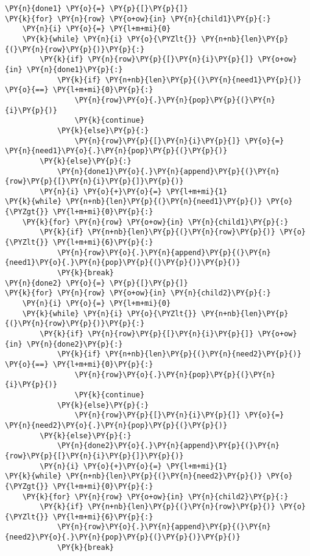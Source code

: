 \begin{tcolorbox}[breakable, size=fbox, boxrule=1pt, pad at break*=1mm,colback=cellbackground, colframe=cellborder]
\begin{Verbatim}[commandchars=\\\{\}]
\PY{n}{done1} \PY{o}{=} \PY{p}{[}\PY{p}{]}
\PY{k}{for} \PY{n}{row} \PY{o+ow}{in} \PY{n}{child1}\PY{p}{:}
    \PY{n}{i} \PY{o}{=} \PY{l+m+mi}{0}
    \PY{k}{while} \PY{n}{i} \PY{o}{\PYZlt{}} \PY{n+nb}{len}\PY{p}{(}\PY{n}{row}\PY{p}{)}\PY{p}{:}
        \PY{k}{if} \PY{n}{row}\PY{p}{[}\PY{n}{i}\PY{p}{]} \PY{o+ow}{in} \PY{n}{done1}\PY{p}{:}
            \PY{k}{if} \PY{n+nb}{len}\PY{p}{(}\PY{n}{need1}\PY{p}{)} \PY{o}{==} \PY{l+m+mi}{0}\PY{p}{:}
                \PY{n}{row}\PY{o}{.}\PY{n}{pop}\PY{p}{(}\PY{n}{i}\PY{p}{)}
                \PY{k}{continue}
            \PY{k}{else}\PY{p}{:}
                \PY{n}{row}\PY{p}{[}\PY{n}{i}\PY{p}{]} \PY{o}{=} \PY{n}{need1}\PY{o}{.}\PY{n}{pop}\PY{p}{(}\PY{p}{)}
        \PY{k}{else}\PY{p}{:}
            \PY{n}{done1}\PY{o}{.}\PY{n}{append}\PY{p}{(}\PY{n}{row}\PY{p}{[}\PY{n}{i}\PY{p}{]}\PY{p}{)}
        \PY{n}{i} \PY{o}{+}\PY{o}{=} \PY{l+m+mi}{1}
\PY{k}{while} \PY{n+nb}{len}\PY{p}{(}\PY{n}{need1}\PY{p}{)} \PY{o}{\PYZgt{}} \PY{l+m+mi}{0}\PY{p}{:}
    \PY{k}{for} \PY{n}{row} \PY{o+ow}{in} \PY{n}{child1}\PY{p}{:}
        \PY{k}{if} \PY{n+nb}{len}\PY{p}{(}\PY{n}{row}\PY{p}{)} \PY{o}{\PYZlt{}} \PY{l+m+mi}{6}\PY{p}{:}
            \PY{n}{row}\PY{o}{.}\PY{n}{append}\PY{p}{(}\PY{n}{need1}\PY{o}{.}\PY{n}{pop}\PY{p}{(}\PY{p}{)}\PY{p}{)}
            \PY{k}{break}
\PY{n}{done2} \PY{o}{=} \PY{p}{[}\PY{p}{]}
\PY{k}{for} \PY{n}{row} \PY{o+ow}{in} \PY{n}{child2}\PY{p}{:}
    \PY{n}{i} \PY{o}{=} \PY{l+m+mi}{0}
    \PY{k}{while} \PY{n}{i} \PY{o}{\PYZlt{}} \PY{n+nb}{len}\PY{p}{(}\PY{n}{row}\PY{p}{)}\PY{p}{:}
        \PY{k}{if} \PY{n}{row}\PY{p}{[}\PY{n}{i}\PY{p}{]} \PY{o+ow}{in} \PY{n}{done2}\PY{p}{:}
            \PY{k}{if} \PY{n+nb}{len}\PY{p}{(}\PY{n}{need2}\PY{p}{)} \PY{o}{==} \PY{l+m+mi}{0}\PY{p}{:}
                \PY{n}{row}\PY{o}{.}\PY{n}{pop}\PY{p}{(}\PY{n}{i}\PY{p}{)}
                \PY{k}{continue}
            \PY{k}{else}\PY{p}{:}
                \PY{n}{row}\PY{p}{[}\PY{n}{i}\PY{p}{]} \PY{o}{=} \PY{n}{need2}\PY{o}{.}\PY{n}{pop}\PY{p}{(}\PY{p}{)}
        \PY{k}{else}\PY{p}{:}
            \PY{n}{done2}\PY{o}{.}\PY{n}{append}\PY{p}{(}\PY{n}{row}\PY{p}{[}\PY{n}{i}\PY{p}{]}\PY{p}{)}
        \PY{n}{i} \PY{o}{+}\PY{o}{=} \PY{l+m+mi}{1}
\PY{k}{while} \PY{n+nb}{len}\PY{p}{(}\PY{n}{need2}\PY{p}{)} \PY{o}{\PYZgt{}} \PY{l+m+mi}{0}\PY{p}{:}
    \PY{k}{for} \PY{n}{row} \PY{o+ow}{in} \PY{n}{child2}\PY{p}{:}
        \PY{k}{if} \PY{n+nb}{len}\PY{p}{(}\PY{n}{row}\PY{p}{)} \PY{o}{\PYZlt{}} \PY{l+m+mi}{6}\PY{p}{:}
            \PY{n}{row}\PY{o}{.}\PY{n}{append}\PY{p}{(}\PY{n}{need2}\PY{o}{.}\PY{n}{pop}\PY{p}{(}\PY{p}{)}\PY{p}{)}
            \PY{k}{break}


\end{Verbatim}
\end{tcolorbox}
